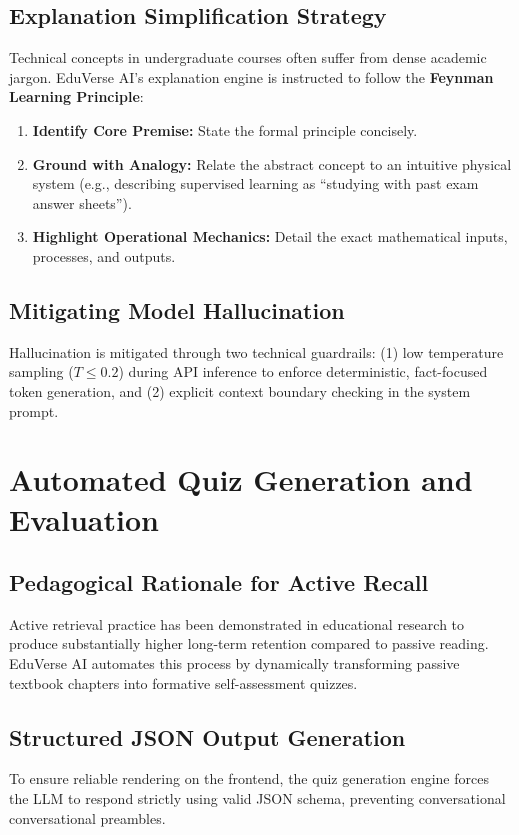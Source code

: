 \documentclass[11pt,a4paper]{report}
\begin{document}
\section{Explanation Simplification Strategy}
Technical concepts in undergraduate courses often suffer from dense academic jargon. EduVerse AI's explanation engine is instructed to follow the \textbf{Feynman Learning Principle}:
\begin{enumerate}[noitemsep, topsep=2pt]
    \item \textbf{Identify Core Premise:} State the formal principle concisely.
    \item \textbf{Ground with Analogy:} Relate the abstract concept to an intuitive physical system (e.g., describing supervised learning as ``studying with past exam answer sheets'').
    \item \textbf{Highlight Operational Mechanics:} Detail the exact mathematical inputs, processes, and outputs.
\end{enumerate}

\section{Mitigating Model Hallucination}
Hallucination is mitigated through two technical guardrails: (1) low temperature sampling ($T \le 0.2$) during API inference to enforce deterministic, fact-focused token generation, and (2) explicit context boundary checking in the system prompt.
\clearpage

\chapter{Automated Quiz Generation and Evaluation}
\label{ch:quiz}

\section{Pedagogical Rationale for Active Recall}
Active retrieval practice has been demonstrated in educational research to produce substantially higher long-term retention compared to passive reading. EduVerse AI automates this process by dynamically transforming passive textbook chapters into formative self-assessment quizzes.

\section{Structured JSON Output Generation}
To ensure reliable rendering on the frontend, the quiz generation engine forces the LLM to respond strictly using valid JSON schema, preventing conversational conversational preambles.
\end{document}
